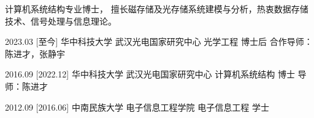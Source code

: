 \documentclass[zh]{resume}
\begin{document}
\makeheader
{\onehalfspacing\hspace{2em}%
计算机系统结构专业博士，
擅长磁存储及光存储系统建模与分析，热衷数据存储技术、信号处理与信息理论。
\par}


\begin{educations}
  \education%
    {2023.03}%
    [至今]%
    {华中科技大学}%
    {武汉光电国家研究中心}%
    {光学工程}%
    {博士后}%
    {合作导师：陈进才，张静宇}

  \separator{0.5ex}
  \education%
    {2016.09}%
    [2022.12]%
    {华中科技大学}%
    {武汉光电国家研究中心}%
    {计算机系统结构}%
    {博士}%
    {导师：陈进才}

  \separator{0.5ex}
  \education%
    {2012.09}%
    [2016.06]%
    {中南民族大学}%
    {电子信息工程学院}%
    {电子信息工程}%
    {学士}%
    {}
\end{educations}

\end{document}
